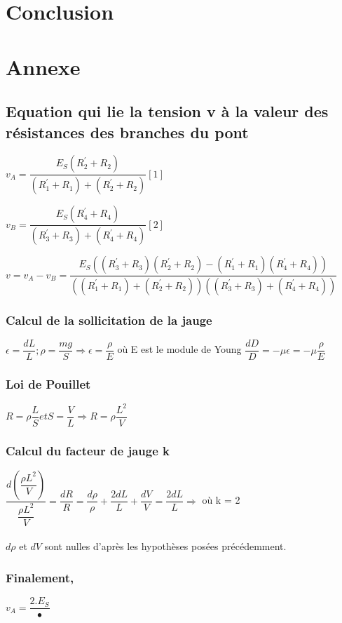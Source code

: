\documentclass[11pt,a4paper]{report}
\begin{document}
\section*{Conclusion}	
\section*{Annexe}	
\subsection*{Equation qui lie la tension v à la valeur des résistances des branches du pont}
$v_{A} = \dfrac{E_{S}(R^{'}_{2}+R_{2})}{(R^{'}_{1}+R_{1})+(R^{'}_{2}+R_{2})} [1]$ 

$v_{B} = \dfrac{E_{S}(R^{'}_{4}+R_{4})}{(R^{'}_{3}+R_{3})+(R^{'}_{4}+R_{4})} [2]$

$v = v_{A} - v_{B} = \dfrac{E_{S}((R^{'}_{3}+R_{3})(R^{'}_{2}+R_{2})-(R^{'}_{1}+R_{1})(R^{'}_{4}+R_{4}))}{((R^{'}_{1}+R_{1})+(R^{'}_{2}+R_{2}))((R^{'}_{3}+R_{3})+(R^{'}_{4}+R_{4}))}$ 
\subsubsection*{Calcul de la sollicitation de la jauge}
$\epsilon = \dfrac{dL}{L} ; \rho = \dfrac{mg}{S} \Rightarrow \epsilon = \dfrac{\rho}{E}$ où E est le module de Young 
$\dfrac{dD}{D} = - \mu \epsilon = - \mu \dfrac{\rho}{E}$
\subsubsection{Loi de Pouillet}
$R = \rho \dfrac{L}{S} et S  = \dfrac{V}{L} \Rightarrow R = \rho \dfrac{L^{2}}{V}$ 
\subsubsection{Calcul du facteur de jauge k}
$\dfrac{d(\dfrac{\rho L^{2}}{V})}{\dfrac{\rho L^{2}}{V}} = \dfrac{dR}{R} = \dfrac{d\rho}{\rho} + \dfrac{2dL}{L}+\dfrac{dV}{V}  =  \dfrac{2dL}{L} \Rightarrow$ où k = 2
~\\~\\
$d\rho$ et $dV$ sont nulles d'après les hypothèses posées précédemment.~\\
\subsubsection{Finalement,}
$v_{A} = \dfrac{2.E_{S}}{•}$
\end{document}
